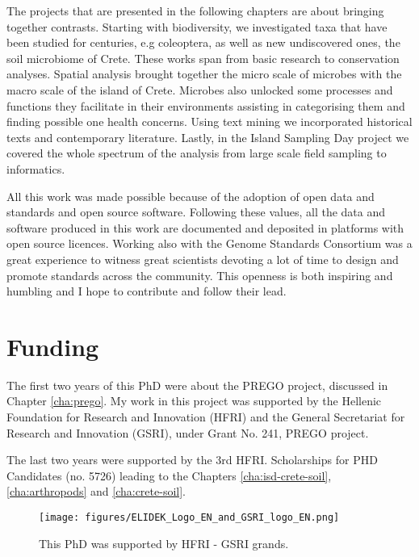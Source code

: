 \documentclass[
11pt, %
english, %
singlespacing, %
liststotoc, %
toctotoc, %
headsepline, %
]{MastersDoctoralThesis} %
\begin{document}
The projects that are presented in the following chapters are about 
bringing together contrasts. Starting with biodiversity, we investigated taxa that 
have been studied for centuries, e.g coleoptera, as well as new undiscovered ones, the soil microbiome of 
Crete. These works span from basic research to conservation analyses. 
Spatial analysis brought together the micro scale of microbes with the macro
scale of the island of Crete.
Microbes also unlocked some processes and functions they facilitate in their environments assisting in
categorising them and finding possible one health concerns.
Using text mining we incorporated historical texts and contemporary literature.
Lastly, in the Island Sampling Day project we covered
the whole spectrum of the analysis from large scale field sampling to informatics.

All this work was made possible because of the adoption of open data and standards
and open source software. Following these values, all the data and software produced
in this work are documented and deposited in platforms with open source licences. 
Working also with the Genome Standards Consortium was a great experience to witness
great scientists devoting a lot of time to design and promote standards across the 
community. This openness is both inspiring and humbling and I hope to contribute and follow 
their lead.

\chapter*{Funding}

The first two years of this PhD were about the PREGO project, discussed in Chapter \ref{cha:prego}. My work in this 
project was supported by the Hellenic Foundation for Research and
Innovation (HFRI) and the General Secretariat for Research and Innovation (GSRI),
under Grant No. 241, PREGO project.

The last two years were supported by the 3rd HFRI. Scholarships for PHD
Candidates (no. 5726) leading to the Chapters \ref{cha:isd-crete-soil}, \ref{cha:arthropods} and \ref{cha:crete-soil}.

   \begin{figure}[h]
      \centering
      \texttt{[image: figures/ELIDEK\_Logo\_EN\_and\_GSRI\_logo\_EN.png]}
      \caption[HFRI and GSRI funding]{
          This PhD was supported by HFRI - GSRI grands. 
      }
      \label{fig:hfri_logo}
   \end{figure}
\end{document}
